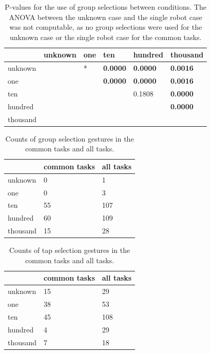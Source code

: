 \begin{table}
	\begin{tabular}{l|l l l l l}
		& unknown & one    & ten        & hundred     & thousand   \\ 
		\hline
		unknown & & * & \textbf{0.0000} & \textbf{0.0000} & \textbf{0.0016} \\   
		one & & & \textbf{0.0000} & \textbf{0.0000} & \textbf{0.0016} \\
		ten & & & & 0.1808 & \textbf{0.0000}   \\
		hundred & & & & & \textbf{0.0000}   \\
		thousand & & & & &\\
	\end{tabular}
	\caption{P-values for the use of group selections between conditions. The ANOVA between the unknown case and the single robot case was not computable, as no group selections were used for the unknown case or the single robot case for the common tasks.}
	\label{tab:group_select_per_task_norm}
\end{table}

\begin{table}
	\begin{tabular}{l | l l}
		& common tasks & all tasks\\
		\hline
		unknown & 0 & 1\\
		one & 0 & 3\\
		ten & 55 & 107 \\
		hundred & 60 & 109\\
		thousand & 15 & 28\\
	\end{tabular}
	\caption{Counts of group selection gestures in the common tasks and all tasks.}
	\label{tab:group_raw_counts}
\end{table}

\begin{table}
	\begin{tabular}{l | l l}
		& common tasks & all tasks\\
		\hline
		unknown & 15 & 29\\
		one & 38 & 53 \\
		ten & 45 & 108\\
		hundred & 4 & 29 \\
		thousand & 7 & 18\\
	\end{tabular}
	\caption{Counts of tap selection gestures in the common tasks and all tasks.}
	\label{tab:tap_raw_counts}
\end{table}

